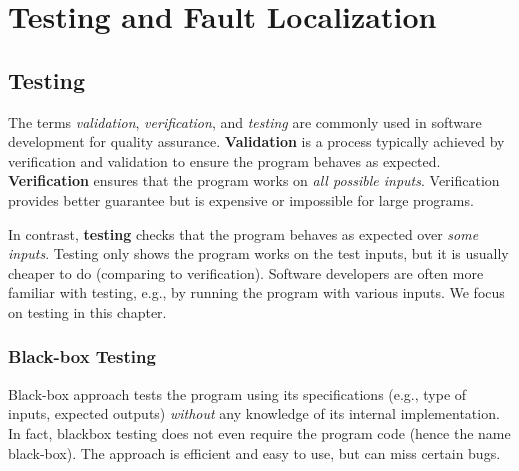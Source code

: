 \documentclass[oneside,11pt,dvipsnames]{book}
\begin{document}
\part{Testing and Fault Localization}



\chapter{Testing}\label{chapter:testing}


The terms \emph{validation}, \emph{verification}, and \emph{testing} are commonly used in software development for quality assurance. \textbf{Validation} is a process typically achieved by verification and validation to ensure the program behaves as expected. \textbf{Verification} ensures that the program works on \emph{all possible inputs}. Verification provides better guarantee but is expensive or impossible for large programs.

In contrast, \textbf{testing} checks that the program behaves as expected over \emph{some inputs}. Testing only shows the program works on the test inputs, but it is usually cheaper to do (comparing to verification). Software developers are often more familiar with testing, e.g., by running the program with various inputs. We focus on testing in this chapter.  


\section{Black-box Testing}\label{sec:blackbox}

Black-box approach tests the program using its specifications (e.g., type of inputs, expected outputs) \emph{without} any knowledge of its internal implementation. In fact, blackbox testing does not even require the program code (hence the name black-box).  The approach is efficient and easy to use, but can miss certain bugs.
\end{document}
